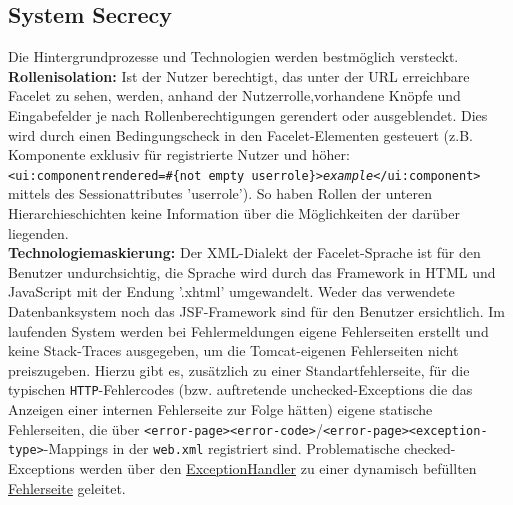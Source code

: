 \documentclass{article}
\begin{document}
\subsection{System Secrecy}
Die Hintergrundprozesse und Technologien werden bestmöglich versteckt.\\
\textbf{Rollenisolation:} Ist der Nutzer berechtigt, das unter der URL erreichbare Facelet zu sehen, werden, anhand der Nutzerrolle,vorhandene Knöpfe und Eingabefelder je nach Rollenberechtigungen gerendert oder ausgeblendet. Dies wird durch einen Bedingungscheck in den Facelet-Elementen gesteuert (z.B. Komponente exklusiv für registrierte Nutzer und höher:\\ \texttt{<ui:component\hspace{2mm}rendered=\dq\#\{not empty userrole\}\dq>\textit{example}</ui:component>} mittels des Sessionattributes 'userrole'). So haben Rollen der unteren Hierarchieschichten keine Information über die Möglichkeiten der darüber liegenden.\\
\textbf{Technologiemaskierung:} Der XML-Dialekt der Facelet-Sprache ist für den Benutzer undurchsichtig, die Sprache wird durch das Framework in HTML und JavaScript mit der Endung '.xhtml' umgewandelt. Weder das verwendete Datenbanksystem noch das JSF-Framework sind für den Benutzer ersichtlich. Im laufenden System werden bei Fehlermeldungen eigene Fehlerseiten erstellt und keine Stack-Traces ausgegeben, um die Tomcat-eigenen Fehlerseiten nicht preiszugeben. Hierzu gibt es, zusätzlich zu einer Standartfehlerseite, für die typischen \texttt{HTTP}-Fehlercodes (bzw. auftretende unchecked-Exceptions die  das Anzeigen einer internen Fehlerseite zur Folge hätten) eigene statische Fehlerseiten, die über \texttt{<error-page><error-code>}/\texttt{<error-page><exception-type>}-Mappings in der \texttt{web.xml} registriert sind. Problematische checked-Exceptions werden über den \hyperlink{ExceptionHandler}{ExceptionHandler} zu einer dynamisch befüllten \hyperlink{invalidaccess}{Fehlerseite} geleitet.
\end{document}
